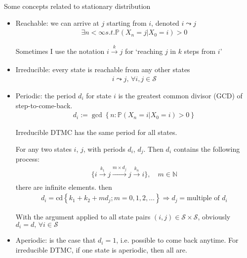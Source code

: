         Some concepts related to stationary distribution
    \begin{itemize}[topsep=2pt,itemsep=0pt]
        \item Reachable: we can arrive at $ j $ starting from $ i $, denoted $ i\leadsto j $
        \begin{align}
            \exists n<\infty s.t. \mathbb{P}\left( X_n=j|X_0=i \right) > 0 
        \end{align}

        Sometimes I use the notation $ i\xrightarrow[]{k}j  $ for `reaching $ j $ in $ k $ steps from $ i $'
        \item Irreducible: every state is reachable from any other states
        \begin{align}
            i\leadsto j,\,\forall i,j\in\mathcal{S} 
        \end{align}
        
        \item Periodic: the period $ d_i $ for state $ i $ is the greatest common divisor (GCD) of step-to-come-back.
        \begin{align}
            d_i:=\gcd\left\{ n:\mathbb{P}\left( X_n=i|X_0=i \right)>0  \right\} 
        \end{align}

        Irreducible DTMC has the same period for all states.

            For any two states $ i $, $ j $, with periods $ d_i $, $ d_j $. Then $ d_i $ contains the following process:
            \begin{align}
                \{i\xrightarrow[]{k_1}j\xrightarrow[]{m\times d_j}j\xrightarrow[]{k_n}i \} ,\quad m\in\mathbb{N}
            \end{align}
            there are infinite elements. then
            \begin{align}
                d_i=\mathrm{cd} \left\{ k_1+k_2+md_j;m=0,1,2,\ldots \right\} \Rightarrow d_j=\text{multiple of }d_i
            \end{align}
         
            With the argument applied to all state pairs $ (i,j)\in\mathcal{S}\times \mathcal{S} $, obviously $ d_i=d,\,\forall i\in\mathcal{S} $
        \item Aperiodic: is the case that $ d_i=1 $, i.e. possible to come back anytime. For irreducible DTMC, if one state is aperiodic, then all are.        
        

\end{itemize}
